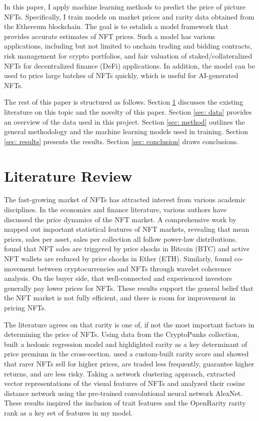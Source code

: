 \documentclass[12pt]{article}
\begin{document}
In this paper, I apply machine learning methods to predict the price of picture NFTs. Specifically, I train models on market prices and rarity data obtained from the Ethereum blockchain. The goal is to estalish a model framework that provides accurate estimates of NFT prices. Such a model has various applications, including but not limited to onchain trading and bidding contracts, risk management for crypto portfolios, and fair valuation of staked/collateralized NFTs for decentralized finance (DeFi) applications. In addition, the model can be used to price large batches of NFTs quickly, which is useful for AI-generated NFTs.

The rest of this paper is structured as follows. Section \ref{sec: lit_review} discusses the existing literature on this topic and the novelty of this paper. Section \ref{sec: data} provides an overview of the data used in this project. Section \ref{sec: method} outlines the general methodology and the machine learning models used in training. Section \ref{sec: results} presents the results. Section \ref{sec: conclusion} draws conclusions.


\section{Literature Review}
\label{sec: lit_review}
The fast-growing market of NFTs has attracted interest from various academic disciplines. In the economics and finance literature, various authors have discussed the price dynamics of the NFT market. A comprehensive work by \citet{nadini2021mapping} mapped out important statistical features of NFT markets, revealing that mean prices, sales per asset, sales per collection all follow power-law distributions. \citet{ante2022non} found that NFT sales are triggered by price shocks in Bitcoin (BTC) and active NFT wallets are reduced by price shocks in  Ether (ETH). Similarly, \citet{dowling2022non} found co-movement between cryptocurrencies and NFTs through wavelet coherence analysis. On the buyer side, \citet{kong2021alternative} that well-connected and experienced investors generally pay lower prices for NFTs. These results support the general belief that the NFT market is not fully efficient, and there is room for improvement in pricing NFTs. 

The literature agrees on that rarity is one of, if not the most important factors in determining the price of NFTs. Using data from the CryptoPunks collection, \citet{kong2021alternative} built a hedonic regression model and highlighted rarity as a key determinant of price premium in the cross-section. \citet{mekacher2022heterogeneous} used a custom-built rarity score and showed that rarer NFTs sell for higher prices, are traded less frequently, guarantee higher returns, and are less risky. Taking a network clustering approach, \citet{nadini2021mapping} extracted vector representations of the visual features of NFTs and analyzed their cosine distance network using the pre-trained convolutional neural network AlexNet. These results inspired the inclusion of trait features and the OpenRarity rarity rank as a key set of features in my model.
\end{document}
